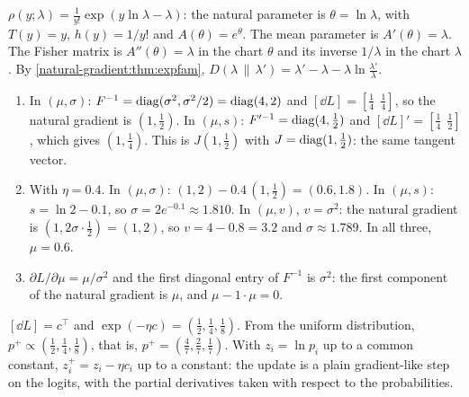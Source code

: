 $\rho(y; \lambda) = \frac1{y!}\exp(y\ln\lambda - \lambda)$: the natural
parameter is $\theta = \ln\lambda$, with $T(y) = y$, $h(y) = 1/y!$ and
$A(\theta) = e^\theta$. The mean parameter is $A'(\theta) = \lambda$.
The Fisher matrix is $A''(\theta) = \lambda$ in the chart $\theta$ and
its inverse $1/\lambda$ in the chart $\lambda$. By
\cref{natural-gradient:thm:expfam},
$D(\lambda\,\|\,\lambda') = \lambda' - \lambda
- \lambda\ln\frac{\lambda'}\lambda$.

\begin{enumerate}[nosep]
  \item In $(\mu, \sigma)$: $F^{-1} = \operatorname{diag}(\sigma^2, \sigma^2/2)
        = \operatorname{diag}(4, 2)$ and $[\dd L] = [\frac14\ \ \frac14]$, so the
        natural gradient is $(1, \frac12)$. In $(\mu, s)$:
        $F'^{-1} = \operatorname{diag}(4, \frac12)$ and
        $[\dd L]' = [\frac14\ \ \frac12]$, which gives $(1, \frac14)$.
        This is $J(1, \frac12)$ with $J = \operatorname{diag}(1, \frac12)$: the same
        tangent vector.
  \item With $\eta = 0.4$. In $(\mu, \sigma)$:
        $(1, 2) - 0.4\,(1, \frac12) = (0.6, 1.8)$. In $(\mu, s)$:
        $s = \ln2 - 0.1$, so $\sigma = 2e^{-0.1}\approx1.810$. In
        $(\mu, v)$, $v = \sigma^2$: the natural gradient is
        $(1, 2\sigma\cdot\frac12) = (1, 2)$, so $v = 4 - 0.8 = 3.2$ and
        $\sigma\approx1.789$. In all three, $\mu = 0.6$.
  \item $\partial L/\partial\mu = \mu/\sigma^2$ and the first diagonal
        entry of $F^{-1}$ is $\sigma^2$: the first component of the
        natural gradient is $\mu$, and $\mu - 1\cdot\mu = 0$.
\end{enumerate}

$[\dd L] = c^\top$ and $\exp(-\eta c) = (\frac12, \frac14, \frac18)$.
From the uniform distribution,
$p^+\propto(\frac12, \frac14, \frac18)$, that is,
$p^+ = (\frac47, \frac27, \frac17)$. With $z_i = \ln p_i$ up to a common
constant, $z_i^+ = z_i - \eta c_i$ up to a constant: the update is a
plain gradient-like step on the logits, with the partial derivatives
taken with respect to the probabilities.

